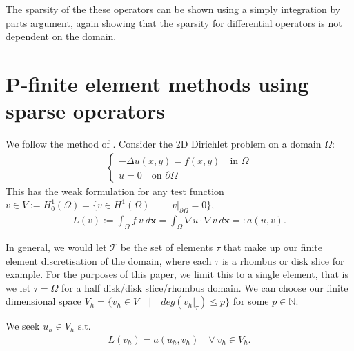 \documentclass[11pt, oneside]{article}   	%
\newcommand{\N}{\mathbb{N}}
\newcommand{\element}{\tau}
\newcommand{\FEset}{\mathcal{T}}
\begin{document}
The sparsity of the these operators can be shown using a simply integration by parts argument, again showing that the sparsity for differential operators is not dependent on the domain.


%
\section{P-finite element methods using sparse operators}

We follow the method of \cite{beuchler2006new}. Consider the 2D Dirichlet problem on a domain $\Omega$:
\begin{align}
	\begin{cases}
         - \Delta u(x,y) = f(x,y) \quad \text{in } \Omega \\
         u = 0 \quad \text{on } \partial \Omega
         \end{cases}
\end{align}
This has the weak formulation for any test function $v \in V := H_0^1(\Omega) = \{v \in H^1(\Omega) \quad | \quad v|_{\partial \Omega} = 0 \}$,
\begin{align}
	L(v) := \int_\Omega f \: v \: d\mathbf{x} = \int_\Omega \nabla u \cdot \nabla v \: d\mathbf{x} =: a(u,v).
\end{align}

In general, we would let $\FEset$ be the set of elements $\element$ that make up our finite element discretisation of the domain, where each $\element$ is a rhombus or disk slice for example. For the purposes of this paper, we limit this to a single element, that is we let $\element = \Omega$ for a half disk/disk slice/rhombus domain. We can choose our finite dimensional space $V_h = \{v_h \in V \quad | \quad deg(v_h|_\element) \le p\}$ for some $p \in \N$.

We seek $u_h \in V_h$ s.t.
\begin{align}
	L(v_h) = a(u_h,v_h) \quad \forall \: v_h \in V_h.
\end{align}
\end{document}
